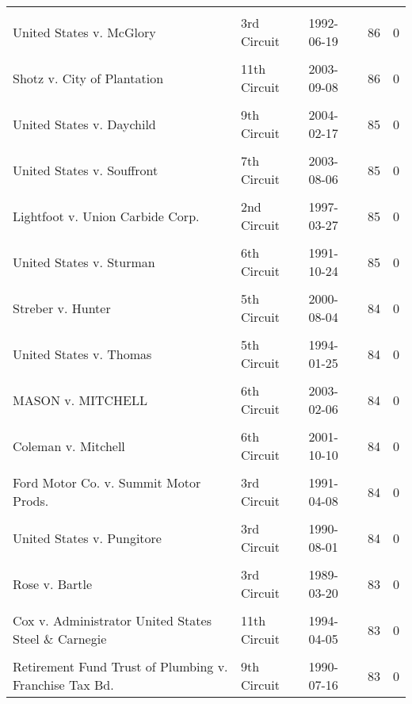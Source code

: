 \documentclass[10pt, letterpaper]{article}
\begin{document}
\begin{spacing}{1.0}
\begin{footnotesize}
\begin{longtable}[H]{p{3.5in}llrr}
        & & & &\\[-6pt]
        United States v. McGlory & 3rd Circuit & 1992-06-19 & 86 & 0\\
        & & & &\\[-6pt]
        Shotz v. City of Plantation & 11th Circuit & 2003-09-08 & 86 & 0\\
        & & & &\\[-6pt]
        United States v. Daychild & 9th Circuit & 2004-02-17 & 85 & 0\\
        & & & &\\[-6pt]
        United States v. Souffront & 7th Circuit & 2003-08-06 & 85 & 0\\
        & & & &\\[-6pt]
        Lightfoot v. Union Carbide Corp. & 2nd Circuit & 1997-03-27 & 85 & 0\\
        & & & &\\[-6pt]
        United States v. Sturman & 6th Circuit & 1991-10-24 & 85 & 0\\
        & & & &\\[-6pt]
        Streber v. Hunter & 5th Circuit & 2000-08-04 & 84 & 0\\
        & & & &\\[-6pt]
        United States v. Thomas & 5th Circuit & 1994-01-25 & 84 & 0\\
        & & & &\\[-6pt]
        MASON v. MITCHELL & 6th Circuit & 2003-02-06 & 84 & 0\\
        & & & &\\[-6pt]
        Coleman v. Mitchell & 6th Circuit & 2001-10-10 & 84 & 0\\
        & & & &\\[-6pt]
        Ford Motor Co. v. Summit Motor Prods. & 3rd Circuit & 1991-04-08 & 84 & 0\\
        & & & &\\[-6pt]
        United States v. Pungitore & 3rd Circuit & 1990-08-01 & 84 & 0\\
        & & & &\\[-6pt]
        Rose v. Bartle & 3rd Circuit & 1989-03-20 & 83 & 0\\
        & & & &\\[-6pt]
        Cox v. Administrator United States Steel \& Carnegie & 11th Circuit & 1994-04-05 & 83 & 0\\
        & & & &\\[-6pt]
        Retirement Fund Trust of Plumbing v. Franchise Tax Bd. & 9th Circuit & 1990-07-16 & 83 & 0\\

\end{longtable}
\end{footnotesize}
\end{spacing}
\end{document}
